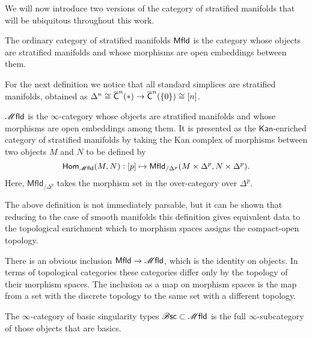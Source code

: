 \documentclass[../text]{subfiles}
\begin{document}
We will now introduce two versions of the category of stratified manifolds that will be ubiquitous throughout this work.

\begin{definition}
    The ordinary category of stratified manifolds $\mfld[r]$ is the category whose objects are stratified manifolds and whose morphisms are open embeddings between them.
\end{definition}

For the next definition we notice that all standard simplices are stratified manifolds, obtained as $\Delta^n \cong \cone[b]^n(\ast) \to \cone[b]^n(\{0\}) \cong [n]$.

\begin{definition}
    $\mfld$ is the $\infty$-category whose objects are stratified manifolds and whose morphisms are open embeddings among them. It is presented as the $\mathsf{Kan}$-enriched category of stratified manifolds by taking the Kan complex of morphisms between two objects $M$ and $N$ to be defined by
    \begin{equation}
        \mathsf{Hom}_{\mfld} (M, N): [p] \mapsto \mathsf{Mfld}_{/\Delta^p} (M \times \Delta^p, N \times \Delta^p).
    \end{equation}
    Here, $\mathsf{Mfld}_{/\Delta^p}$ takes the morphism set in the over-category over $\Delta^p$.
\end{definition}

\begin{remark}
    The above definition is not immediately parsable, but it can be shown that reducing to the case of smooth manifolds this definition gives equivalent data to the topological enrichment which to morphism spaces assigns the compact-open topology. 
\end{remark}

\begin{remark}
    There is an obvious inclusion $\mfld[r] \xrightarrow{} \mfld$, which is the identity on objects. In terms of topological categories these categories differ only by the topology of their morphism spaces. The inclusion as a map on morphism spaces is the map from a set with the discrete topology to the same set with a different topology.
\end{remark}

\begin{definition}
    The $\infty$-category of basic singularity types $\bsc \subset \mfld$ is the full $\infty$-subcategory of those objects that are basics.
\end{definition}
\end{document}

